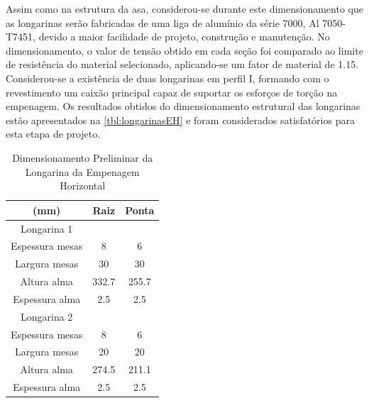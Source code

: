 Assim como na estrutura da asa, considerou-se durante este dimensionamento que as longarinas serão fabricadas de uma liga de alumínio da série 7000, Al 7050-T7451, devido a maior facilidade de projeto, construção e manutenção.
No dimensionamento, o valor de tensão obtido em cada seção foi comparado ao limite de resistência do material selecionado, aplicando-se um fator de material de 1.15.
Considerou-se a existência de duas longarinas em perfil I, formando com o revestimento um caixão principal capaz de suportar os esforços de torção na empenagem.
Os resultados obtidos do dimensionamento estrutural das longarinas estão apresentados na \autoref{tbl:longarinasEH} e foram considerados satisfatórios para esta etapa de projeto.

\begin{table}[H]
\centering
\begin{tabular}{ccc}
\toprule
(mm) & Raiz & Ponta \\ \midrule
Longarina 1 &  &   \\ \midrule
Espessura mesas & 8 & 6 \\
Largura mesas & 30 & 30\\
Altura alma & 332.7 & 255.7 \\
Espessura alma & 2.5 & 2.5 \\ \midrule
Longarina 2 &  &   \\ \midrule
Espessura mesas & 8 & 6 \\
Largura mesas & 20 & 20 \\
Altura alma & 274.5 & 211.1 \\
Espessura alma & 2.5 & 2.5 \\
\bottomrule
\end{tabular}
\caption{Dimensionamento Preliminar da Longarina da Empenagem Horizontal}
\label{tbl:longarinasEH}
\end{table}
